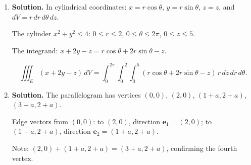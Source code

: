 \begin{enumerate}
Jacobian: $\frac{\partial(x,y)}{\partial(u,v)} = \begin{vmatrix} 1/\sqrt{2} & 1/\sqrt{2} \\ -1/\sqrt{2} & 1/\sqrt{2}\end{vmatrix} = \frac{1}{2}+\frac{1}{2} = 1$.

The square $R$ has vertices $(0,0)$, $(2,0)$, $(2,2)$, $(0,2)$. Under the transformation:
\begin{itemize}
\item $(0,0)\to(0,0)$
\item $(2,0)\to(\sqrt{2},\sqrt{2})$
\item $(2,2)\to(0,2\sqrt{2})$
\item $(0,2)\to(-\sqrt{2},\sqrt{2})$
\end{itemize}

The image is a square in the $uv$-plane rotated $45°$, with vertices as listed---a diamond with diagonals along the axes from $-\sqrt{2}$ to $\sqrt{2}$ in $u$ and $0$ to $2\sqrt{2}$ in $v$.

The new region $R'$ in $(u,v)$: For $0\le v\le\sqrt{2}$, $u\in[-v,v]$; for $\sqrt{2}\le v\le 2\sqrt{2}$, $u\in[-(2\sqrt{2}-v),2\sqrt{2}-v]$.

Since the integrand is 1 and $|J|=1$:
\[
\boxed{\iint_R 1\,dx\,dy = \int_0^{\sqrt{2}}\int_{-v}^{v}1\,du\,dv + \int_{\sqrt{2}}^{2\sqrt{2}}\int_{-(2\sqrt{2}-v)}^{2\sqrt{2}-v}1\,du\,dv}.
\]

(The result is $4$, matching the area of the original square.)

\item \textbf{Solution.}
In cylindrical coordinates: $x = r\cos\theta$, $y = r\sin\theta$, $z = z$, and $dV = r\,dr\,d\theta\,dz$.

The cylinder $x^2+y^2\le 4$: $0\le r\le 2$, $0\le\theta\le 2\pi$, $0\le z\le 5$.

The integrand: $x+2y-z = r\cos\theta+2r\sin\theta-z$.

\[
\boxed{\iiint_E(x+2y-z)\,dV = \int_0^{2\pi}\int_0^2\int_0^5(r\cos\theta+2r\sin\theta-z)\,r\,dz\,dr\,d\theta}.
\]

\item \textbf{Solution.}
The parallelogram has vertices $(0,0)$, $(2,0)$, $(1+a,2+a)$, $(3+a,2+a)$.

Edge vectors from $(0,0)$: to $(2,0)$, direction $\mathbf{e}_1 = (2,0)$; to $(1+a,2+a)$, direction $\mathbf{e}_2 = (1+a,2+a)$.

Note: $(2,0)+(1+a,2+a) = (3+a,2+a)$, confirming the fourth vertex.


\end{enumerate}
